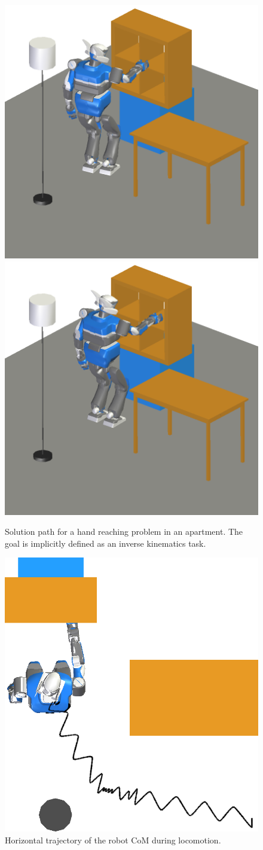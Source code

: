 \documentclass{article}
\begin{document}
\begin{figure}[h]
\includegraphics[width=0.24\linewidth]{pics/shelves/trajectory-7.png}
\includegraphics[width=0.24\linewidth]{pics/shelves/trajectory-8.png}

\caption{Solution path for a hand reaching problem in an
  apartment. The goal is implicitly defined as an inverse kinematics
  task.} 
\label{fig:shelf}
\end{figure}




\begin{figure}[h]
\centering

\includegraphics[width=0.4\linewidth]{pics/shelves/waist-trajectory.png}


\caption{Horizontal trajectory of the robot CoM during
    locomotion.}
\label{fig:shelf-waist}
\end{figure}
\end{document}
